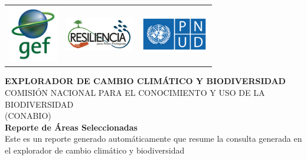 \begin{titlepage}
\begin{center}
\begin{table}[h!]
\begin{tabular}{ccccc}
				\multicolumn{2}{c}{\includegraphics[height=2.5cm]{./logos/gef.png}} &
				\multicolumn{2}{c}{\includegraphics[width=3cm]{./logos/resiliencia.png}} &
				\includegraphics[width=3cm]{./logos/pnud.png}


			\end{tabular}
	\end{table}
	\bigskip
	\bigskip
	\large\textbf{EXPLORADOR DE CAMBIO CLIM\'ATICO Y BIODIVERSIDAD }\\
	\bigskip
	COMISI\'ON NACIONAL PARA EL CONOCIMIENTO Y USO DE LA BIODIVERSIDAD \\
	(CONABIO) \\

	\textbf{Reporte de \'Areas Seleccionadas} \\
	Este es un reporte generado autom\'aticamente que resume la consulta generada en el explorador de cambio clim\'atico y biodiversidad
	\bigskip
	\bigskip
	\bigskip

\end{center}




\end{titlepage}
